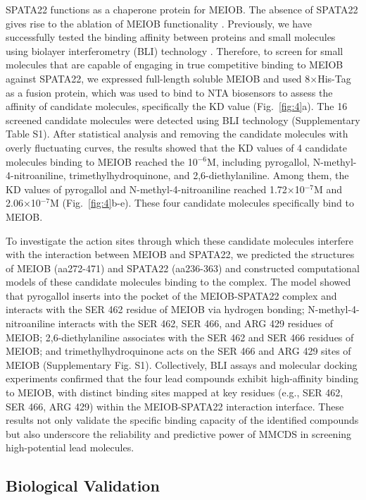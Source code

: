 \documentclass[preprint,12pt]{elsarticle}
\theoremstyle{plain}
\theoremstyle{definition}
\theoremstyle{remark}
\begin{document}
SPATA22 functions as a chaperone protein for MEIOB. The absence of SPATA22 gives rise to the ablation of MEIOB functionality \cite{6,9,10}. Previously, we have successfully tested the binding affinity between proteins and small molecules using biolayer interferometry (BLI) technology \cite{11}. Therefore, to screen for small molecules that are capable of engaging in true competitive binding to MEIOB against SPATA22, we expressed full-length soluble MEIOB and used 8×His-Tag as a fusion protein, which was used to bind to NTA biosensors to assess the affinity of candidate molecules, specifically the $\text{KD}$ value (Fig.~\ref{fig:4}a). The 16 screened candidate molecules were detected using BLI technology (Supplementary Table S1). After statistical analysis and removing the candidate molecules with overly fluctuating curves, the results showed that the $\text{KD}$ values of 4 candidate molecules binding to MEIOB reached the 10$^{-6}$M, including pyrogallol, N-methyl-4-nitroaniline, trimethylhydroquinone, and 2,6-diethylaniline. Among them, the $\text{KD}$ values of pyrogallol and N-methyl-4-nitroaniline reached 1.72×10$^{-7}$M and 2.06×10$^{-7}$M (Fig.~\ref{fig:4}b-e). These four candidate molecules specifically bind to MEIOB.

To investigate the action sites through which these candidate molecules interfere with the interaction between MEIOB and SPATA22, we predicted the structures of MEIOB (aa272-471) and SPATA22 (aa236-363) and constructed computational models of these candidate molecules binding to the complex. The model showed that pyrogallol inserts into the pocket of the MEIOB-SPATA22 complex and interacts with the SER 462 residue of MEIOB via hydrogen bonding; N-methyl-4-nitroaniline interacts with the SER 462, SER 466, and ARG 429 residues of MEIOB; 2,6-diethylaniline associates with the SER 462 and SER 466 residues of MEIOB; and trimethylhydroquinone acts on the SER 466 and ARG 429 sites of MEIOB (Supplementary  Fig. S1). Collectively, BLI assays and molecular docking experiments confirmed that the four lead compounds exhibit high-affinity binding to MEIOB, with distinct binding sites mapped at key residues (e.g., SER 462, SER 466, ARG 429) within the MEIOB-SPATA22 interaction interface. These results not only validate the specific binding capacity of the identified compounds but also underscore the reliability and predictive power of MMCDS in screening high-potential lead molecules.



\subsection*{Biological Validation}
\end{document}
